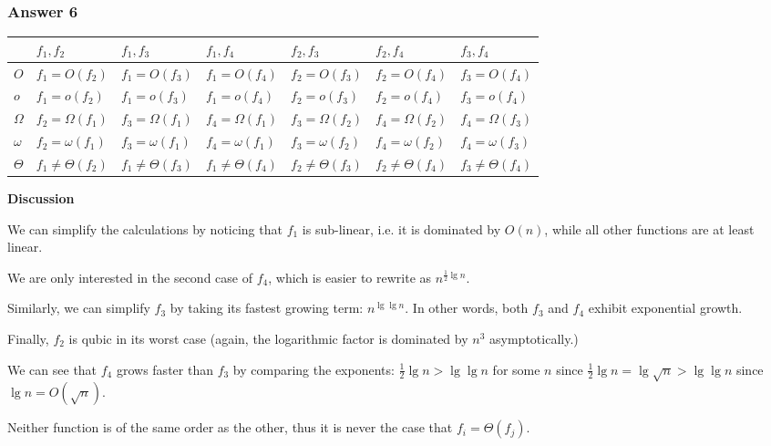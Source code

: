 \documentclass[11pt]{article}
\begin{document}
\subsubsection{Answer 6}
\label{sec:orgheadline10}
\begin{center}
\begin{tabular}{l|llllll}
 & \(f_1, f_2\) & \(f_1,f_3\) & \(f_1,f_4\) & \(f_2,f_3\) & \(f_2,f_4\) & \(f_3,f_4\)\\
\hline
\(O\) & \(f_1 = O(f_2)\) & \(f_1 = O(f_3)\) & \(f_1 = O(f_4)\) & \(f_2 = O(f_3)\) & \(f_2 = O(f_4)\) & \(f_3 = O(f_4)\)\\
\(o\) & \(f_1 = o(f_2)\) & \(f_1 = o(f_3)\) & \(f_1 = o(f_4)\) & \(f_2 = o(f_3)\) & \(f_2 = o(f_4)\) & \(f_3 = o(f_4)\)\\
\(\Omega\) & \(f_2 = \Omega(f_1)\) & \(f_3 = \Omega(f_1)\) & \(f_4 = \Omega(f_1)\) & \(f_3 = \Omega(f_2)\) & \(f_4 = \Omega(f_2)\) & \(f_4 = \Omega(f_3)\)\\
\(\omega\) & \(f_2 = \omega(f_1)\) & \(f_3 = \omega(f_1)\) & \(f_4 = \omega(f_1)\) & \(f_3 = \omega(f_2)\) & \(f_4 = \omega(f_2)\) & \(f_4 = \omega(f_3)\)\\
\(\Theta\) & \(f_1 \neq \Theta(f_2)\) & \(f_1 \neq \Theta(f_3)\) & \(f_1 \neq \Theta(f_4)\) & \(f_2 \neq \Theta(f_3)\) & \(f_2 \neq \Theta(f_4)\) & \(f_3 \neq \Theta(f_4)\)\\
\end{tabular}
\end{center}

\textbf{Discussion}

We can simplify the calculations by noticing that \(f_1\) is sub-linear,
i.e. it is dominated by \(O(n)\), while all other functions are at least
linear.

We are only interested in the second case of \(f_4\), which is easier to
rewrite as \(n^{\frac{1}{2}\lg n}\).

Similarly, we can simplify \(f_3\) by taking its fastest growing term: \(n^{\lg
    \lg n}\).  In other words, both \(f_3\) and \(f_4\) exhibit exponential growth.

Finally, \(f_2\) is qubic in its worst case (again, the logarithmic factor is
dominated by \(n^3\) asymptotically.)

We can see that \(f_4\) grows faster than \(f_3\) by comparing the exponents:
\(\frac{1}{2}\lg n > \lg \lg n\) for some \(n\) since \(\frac{1}{2}\lg n = \lg
    \sqrt{n} > \lg \lg n\) since \(\lg n = O(\sqrt{n})\).

Neither function is of the same order as the other, thus it is never the
case that \(f_i = \Theta(f_j)\).
\end{document}
